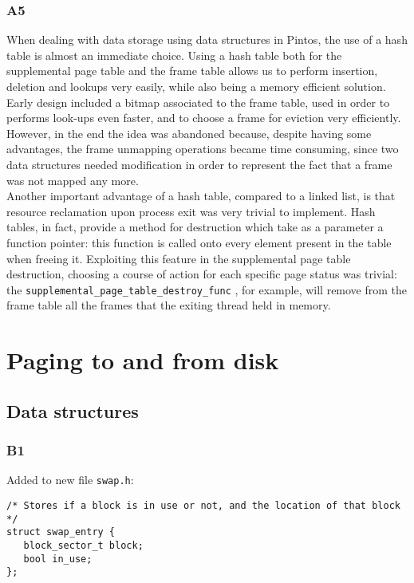 \documentclass[a4wide, 11pt]{article}
\newcommand{\tx}{\texttt}
\begin{document}
\subsubsection{A5}
When dealing with data storage using data structures in Pintos, the use of a hash table is almost an immediate choice. Using a hash table both for the supplemental page table and the frame table allows us to perform insertion, deletion and lookups very easily, while also being a memory efficient solution. Early design included a bitmap associated to the frame table, used in order to performs look-ups even faster, and to choose a frame for eviction very efficiently. However, in the end the idea was abandoned because, despite having some advantages, the frame unmapping operations became time consuming, since two data structures needed modification in order to represent the fact that a frame was not mapped any more. \\
Another important advantage of a hash table, compared to a linked  list, is that resource reclamation upon process exit was very trivial to implement. Hash tables, in fact, provide a method for destruction which take as a parameter a function pointer: this function is called onto every  element present in the table when freeing it. Exploiting this feature in the supplemental page table destruction, choosing a course of action for each specific page status was trivial: the \tx{supplemental\_page\_table\_destroy\_func} , for example, will remove from the frame table all the frames that the exiting thread held in memory.

\section{Paging to and from disk}

\subsection{Data structures}
\subsubsection{B1}

Added to new file \tx{swap.h}:
\begin{verbatim}
/* Stores if a block is in use or not, and the location of that block */
struct swap_entry {
   block_sector_t block;
   bool in_use;
};
\end{verbatim}
\end{document}

